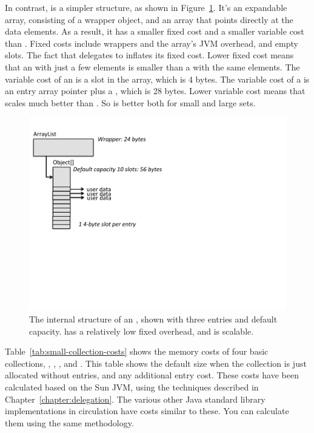 In contrast,  is a simpler structure, as shown in
Figure~\ref{fig:inside-arraylist}. It's an expandable array,
consisting of a wrapper object, and an array that points directly at the data
elements. As a result, it has a smaller fixed cost and a smaller
variable cost than . Fixed costs
include wrappers and the array's JVM overhead, and empty slots.
The fact that  delegates to  inflates its fixed cost. 
Lower fixed cost means that an  with just a few
 elements is smaller than a  with the same elements. 
The variable cost of an  is a slot in the array, which
is 4 bytes. The variable cost of a  is an
entry array pointer plus a , which is 28 bytes. Lower variable cost means that
  scales much better than . So  is better
 both for small and large sets.
 \begin{figure}
  \centering
 \includegraphics[width=.80\textwidth]{part1/Figures/collections/inside-arraylist.pdf}
 \caption{The internal structure of an , shown with three
 entries and default capacity.  has a relatively low
 fixed overhead, and is scalable.}
  \label{fig:inside-arraylist}
\end{figure}
 

Table~\ref{tab:small-collection-costs} shows the memory costs of four basic
collections, , , , and .
This table shows the default size when the collection is just allocated without
entries, and any additional entry cost. These costs have
been calculated based on the Sun JVM, using the techniques described in Chapter~\ref{chapter:delegation}. 
The various other Java standard
library implementations in circulation have costs
similar to these. You can calculate them using the same methodology.


